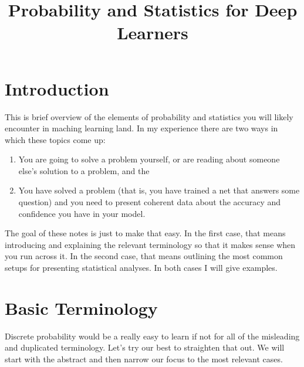 \documentclass[12pt]{amsart}
\numberwithin{equation}{section}
\begin{document}
\title{Probability and Statistics for Deep Learners}
\maketitle

\section{Introduction} This is brief overview of the elements of probability and statistics you will likely encounter in maching learning land.  In my experience there are two ways in which these topics come up:

\begin{enumerate}
\item You are going to solve a problem yourself, or are reading about someone else's solution to a problem, and the
\item You have solved a problem (that is, you have trained a net that answers some question) and you need to present coherent data about the accuracy and confidence you have in your model.
\end{enumerate}

\noindent The goal of these notes is just to make that easy.  In the first case, that means introducing and explaining the relevant terminology so that it makes sense when you run across it.  In the second case, that means outlining the most common setups for presenting statistical analyses.  In both cases I will give examples.

\section{Basic Terminology}\label{S:Terminology} Discrete probability would be a really easy to learn if not for all of the misleading and duplicated terminology.  Let's try our best to straighten that out.  We will start with the abstract and then narrow our focus to the most relevant cases.
\end{document}
